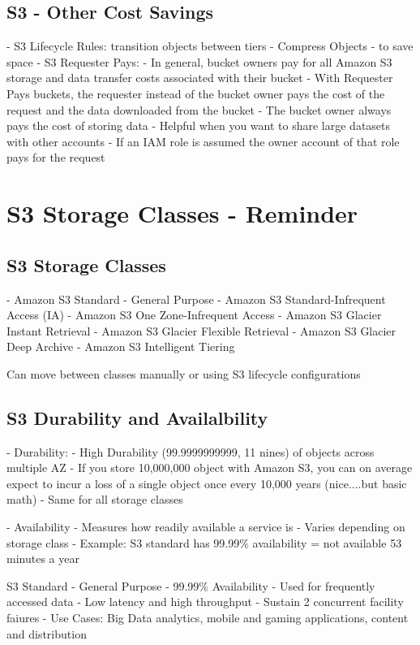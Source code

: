 \documentclass[11pt]{book}
\begin{document}
    \subsection{S3 - Other Cost Savings}
    - S3 Lifecycle Rules: transition objects between tiers
    - Compress Objects - to save space
    - S3 Requester Pays:
    - In general, bucket owners pay for all Amazon S3 storage and data transfer costs associated with their bucket
    - With Requester Pays buckets, the requester instead of the bucket owner pays the cost of the request and the data downloaded from the bucket
    - The bucket owner always pays the cost of storing data
    - Helpful when you want to share large datasets with other accounts
    - If an IAM role is assumed the owner account of that role pays for the request


    \section{S3 Storage Classes - Reminder}

    \subsection{S3 Storage Classes}
    - Amazon S3 Standard - General Purpose
    - Amazon S3 Standard-Infrequent Access (IA)
    - Amazon S3 One Zone-Infrequent Access
    - Amazon S3 Glacier Instant Retrieval
    - Amazon S3 Glacier Flexible Retrieval
    - Amazon S3 Glacier Deep Archive
    - Amazon S3 Intelligent Tiering

    Can move between classes manually or using S3 lifecycle configurations

    \subsection{S3 Durability and Availalbility}
    - Durability:
    - High Durability (99.9999999999, 11 nines) of objects across multiple AZ
    - If you store 10,000,000 object with Amazon S3, you can on average expect to incur a loss of a single object once every 10,000 years (nice....but basic math)
    - Same for all storage classes

    - Availability
    - Measures how readily available a service is
    - Varies depending on storage class
    - Example: S3 standard has 99.99\% availability = not available 53 minutes a year

    S3 Standard - General Purpose
    - 99.99\% Availability
    - Used for frequently accessed data
    - Low latency and high throughput
    - Sustain 2 concurrent facility faiures
    - Use Cases: Big Data analytics, mobile and gaming applications, content and distribution
\end{document}

